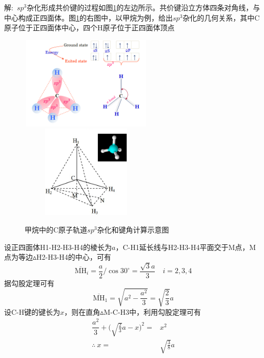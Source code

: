 解:~$sp^3$杂化形成共价键的过程如图\ref{Bond_Hybrid}的左边所示。共价键沿立方体四条对角线，与中心构成正四面体。图\ref{Bond_Hybrid}的右图中，以甲烷为例，给出$sp^3$杂化的几何关系，其中\textrm{C}原子位于正四面体中心，四个\textrm{H}原子位于正四面体顶点
\begin{figure}[h!]
\centering
\vspace{-5.5pt}
\includegraphics[height=1.75in,width=2.50in,viewport=0 0 520 370,clip]{Figures/methane-gas.png}
\includegraphics[height=1.75in,width=2.50in,viewport=0 0 520 370,clip]{Figures/Tetrahedron.png}
\caption{\textrm{甲烷中的C原子轨道$sp^3$杂化和键角计算示意图}}
\label{Bond_Hybrid}
\end{figure}
设正四面体\textrm{H1-H2-H3-H4}的棱长为$a$，\textrm{C-H1}延长线与\textrm{H2-H3-H4}平面交于\textrm{M}点，\textrm{M}点为等边$\vartriangle$\textrm{H2-H3-H4}的中心，可有%
\begin{displaymath}
	\overbar{\mathrm{MH}}_i=\dfrac{a}2/\cos{30^{\circ}}=\dfrac{\sqrt 3a}3\quad i=2,3,4
\end{displaymath}
据勾股定理可有
\begin{displaymath}
	\overbar{\mathrm{MH}}_1=\sqrt{a^2-\frac{a^2}3}=\sqrt{\frac23}a
\end{displaymath}
设\textrm{C-H}键的键长为$x$，则在直角$\vartriangle$\textrm{M-C-H3}中，利用勾股定理可有
\begin{displaymath}
	\begin{aligned}
	\dfrac{a^2}3+\bigg(\sqrt{\frac23}a-x\bigg)^2=&x^2\\
	\therefore~x=&\sqrt{\frac38}a
	\end{aligned}
\end{displaymath}

